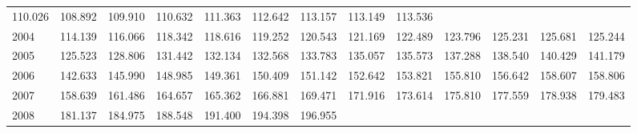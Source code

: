 \begin{tabular}{lllllllllllll}
  \multicolumn{1}{r}{110.026} &
  \multicolumn{1}{r}{108.892} &
  \multicolumn{1}{r}{109.910} &
  \multicolumn{1}{r}{110.632} &
  \multicolumn{1}{r}{111.363} &
  \multicolumn{1}{r}{112.642} &
  \multicolumn{1}{r}{113.157} &
  \multicolumn{1}{r}{113.149} &
  \multicolumn{1}{r}{113.536} \\
\multicolumn{1}{l}{\hspace{1em}2004} &
  \multicolumn{1}{|r}{114.139} &
  \multicolumn{1}{r}{116.066} &
  \multicolumn{1}{r}{118.342} &
  \multicolumn{1}{r}{118.616} &
  \multicolumn{1}{r}{119.252} &
  \multicolumn{1}{r}{120.543} &
  \multicolumn{1}{r}{121.169} &
  \multicolumn{1}{r}{122.489} &
  \multicolumn{1}{r}{123.796} &
  \multicolumn{1}{r}{125.231} &
  \multicolumn{1}{r}{125.681} &
  \multicolumn{1}{r}{125.244} \\
\multicolumn{1}{l}{\hspace{1em}2005} &
  \multicolumn{1}{|r}{125.523} &
  \multicolumn{1}{r}{128.806} &
  \multicolumn{1}{r}{131.442} &
  \multicolumn{1}{r}{132.134} &
  \multicolumn{1}{r}{132.568} &
  \multicolumn{1}{r}{133.783} &
  \multicolumn{1}{r}{135.057} &
  \multicolumn{1}{r}{135.573} &
  \multicolumn{1}{r}{137.288} &
  \multicolumn{1}{r}{138.540} &
  \multicolumn{1}{r}{140.429} &
  \multicolumn{1}{r}{141.179} \\
\multicolumn{1}{l}{\hspace{1em}2006} &
  \multicolumn{1}{|r}{142.633} &
  \multicolumn{1}{r}{145.990} &
  \multicolumn{1}{r}{148.985} &
  \multicolumn{1}{r}{149.361} &
  \multicolumn{1}{r}{150.409} &
  \multicolumn{1}{r}{151.142} &
  \multicolumn{1}{r}{152.642} &
  \multicolumn{1}{r}{153.821} &
  \multicolumn{1}{r}{155.810} &
  \multicolumn{1}{r}{156.642} &
  \multicolumn{1}{r}{158.607} &
  \multicolumn{1}{r}{158.806} \\
\multicolumn{1}{l}{\hspace{1em}2007} &
  \multicolumn{1}{|r}{158.639} &
  \multicolumn{1}{r}{161.486} &
  \multicolumn{1}{r}{164.657} &
  \multicolumn{1}{r}{165.362} &
  \multicolumn{1}{r}{166.881} &
  \multicolumn{1}{r}{169.471} &
  \multicolumn{1}{r}{171.916} &
  \multicolumn{1}{r}{173.614} &
  \multicolumn{1}{r}{175.810} &
  \multicolumn{1}{r}{177.559} &
  \multicolumn{1}{r}{178.938} &
  \multicolumn{1}{r}{179.483} \\
\multicolumn{1}{l}{\hspace{1em}2008} &
  \multicolumn{1}{|r}{181.137} &
  \multicolumn{1}{r}{184.975} &
  \multicolumn{1}{r}{188.548} &
  \multicolumn{1}{r}{191.400} &
  \multicolumn{1}{r}{194.398} &
  \multicolumn{1}{r}{196.955} &

\end{tabular}
